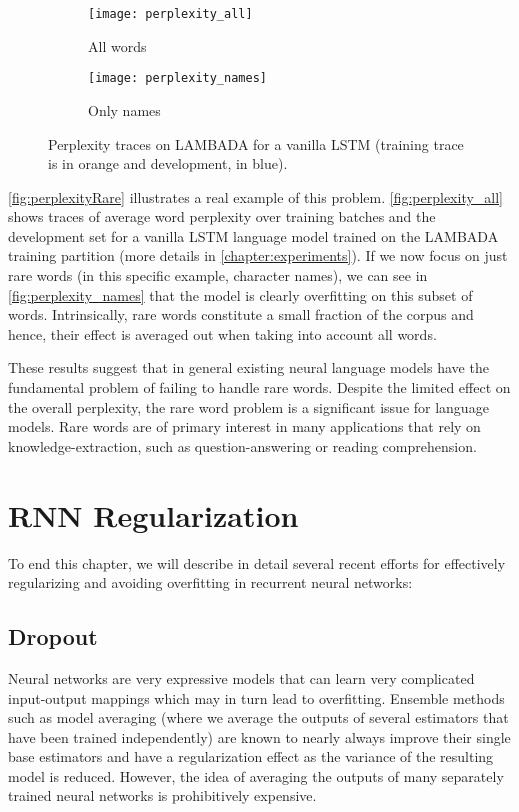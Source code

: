 \begin{figure}[H]
	\centering
	\begin{subfigure}{.5\textwidth}
		\centering
		\texttt{[image: perplexity\_all]}
		\caption{All words}
		\label{fig:perplexity_all}
	\end{subfigure}%
	\begin{subfigure}{.5\textwidth}
		\centering
		\texttt{[image: perplexity\_names]}
		\caption{Only names}
		\label{fig:perplexity_names}
	\end{subfigure}
	\caption{Perplexity traces on LAMBADA for a vanilla LSTM (training trace is in orange and development, in blue).}
	\label{fig:perplexityRare}
\end{figure}

\autoref{fig:perplexityRare} illustrates a real example of this problem. \autoref{fig:perplexity_all} shows traces of average word perplexity over training batches and the development set for a vanilla LSTM language model trained on the LAMBADA training partition (more details in \autoref{chapter:experiments}). If we now focus on just rare words (in this specific example, character names), we can see in \autoref{fig:perplexity_names} that the model is clearly overfitting on this subset of words. Intrinsically, rare words constitute a small fraction of the corpus and hence, their effect is averaged out when taking into account all words.

These results suggest that in general existing neural language models have the fundamental problem of failing to handle rare words. Despite the limited effect on the overall perplexity, the rare word problem is a significant issue for language models. Rare words are of primary interest in many applications that rely on knowledge-extraction, such as question-answering or reading comprehension.

\section{RNN Regularization}
\label{sec:rnnRegularization}

To end this chapter, we will describe in detail several recent efforts for effectively regularizing and avoiding overfitting in recurrent neural networks:

\subsection{Dropout}

Neural networks are very expressive models that can learn very complicated input-output mappings which may in turn lead to overfitting. Ensemble methods such as model averaging (where we average the outputs of several estimators that have been trained independently) are known to nearly always improve their single base estimators and have a regularization effect as the variance of the resulting model is reduced. However, the idea of averaging the outputs of many separately trained neural networks is prohibitively expensive. 

